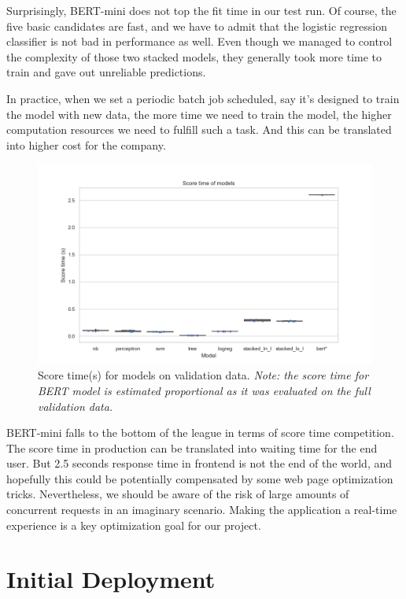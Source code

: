 \documentclass[
]{kaohandt}
\begin{document}
Surprisingly, BERT-mini does not top the fit time in our test run. Of course, the five basic candidates are fast, and we have to admit that the logistic regression classifier is not bad in performance as well. Even though we managed to control the complexity of those two stacked models, they generally took more time to train and gave out unreliable predictions.

In practice, when we set a periodic batch job scheduled, say it’s designed to train the model with new data, the more time we need to train the model, the higher computation resources we need to fulfill such a task. And this can be translated into higher cost for the company.

\begin{figure}[h]
	\includegraphics[]{metric_score_time.png}
	\caption{Score time(s) for models on validation data. \emph{Note: the score time for BERT model is estimated proportional as it was evaluated on the full validation data.}}
	\label{fig:score_time}
\end{figure}


BERT-mini falls to the bottom of the league in terms of score time competition. The score time in production can be translated into waiting time for the end user. But 2.5 seconds response time in frontend is not the end of the world, and hopefully this could be potentially compensated by some web page optimization tricks. Nevertheless, we should be aware of the risk of large amounts of concurrent requests in an imaginary scenario. Making the application a real-time experience is a key optimization goal for our project.

\section{Initial Deployment}
\end{document}
